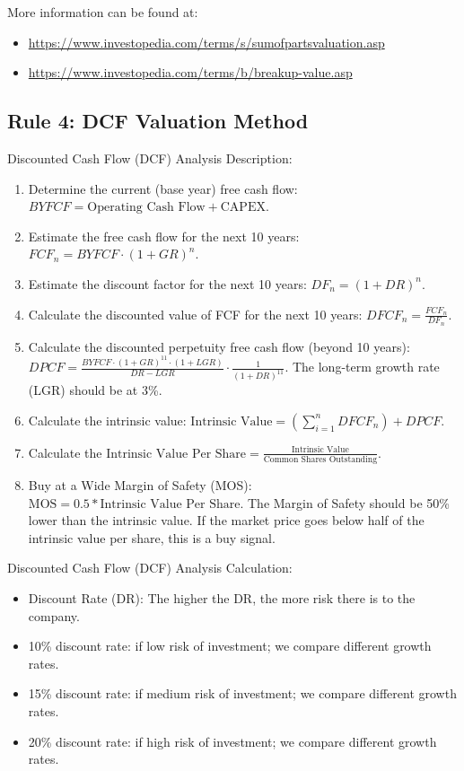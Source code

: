 More information can be found at:
\begin{itemize}
    \item \url{https://www.investopedia.com/terms/s/sumofpartsvaluation.asp}
    \item \url{https://www.investopedia.com/terms/b/breakup-value.asp}
\end{itemize}

\subsection{Rule 4: DCF Valuation Method}

Discounted Cash Flow (DCF) Analysis Description:
\begin{enumerate}
	\item Determine the current (base year) free cash flow: $BYFCF = \text{Operating Cash Flow} + \text{CAPEX}$.
    \item Estimate the free cash flow for the next 10 years: $FCF_n = BYFCF \cdot {(1+GR)}^n$.
    \item Estimate the discount factor for the next 10 years: $DF_n = {(1+DR)}^n$.
	\item Calculate the discounted value of FCF for the next 10 years: $DFCF_n = \frac{FCF_n}{DF_n}$.
	\item Calculate the discounted perpetuity free cash flow (beyond 10 years):
        $DPCF = \frac{BYFCF \cdot {(1+GR)}^{11} \cdot (1+LGR)}{DR-LGR} \cdot \frac{1}{{(1+DR)}^{11}}$.
	The long-term growth rate (LGR) should be at 3\%.
	\item Calculate the intrinsic value: $\text{Intrinsic Value} = (\sum_{i=1}^n DFCF_n) + DPCF$.
	\item Calculate the $\text{Intrinsic Value Per Share} = \frac{\text{Intrinsic Value}}{\text{Common Shares Outstanding}}$.
    \item Buy at a Wide Margin of Safety (MOS): $\text{MOS} = 0.5 * \text{Intrinsic Value Per Share}$.
        The Margin of Safety should be 50\% lower than the intrinsic value. If 
        the market price goes below half of the intrinsic value per share, this 
        is a buy signal.\\
\end{enumerate}

Discounted Cash Flow (DCF) Analysis Calculation:
\begin{itemize}
    \item Discount Rate (DR): The higher the DR, the more risk there is to the 
        company.
    \item 10\% discount rate: if low risk of investment; we compare different growth rates.
    \item 15\% discount rate: if medium risk of investment; we compare different growth rates.
    \item 20\% discount rate: if high risk of investment; we compare different growth rates.
\end{itemize}
